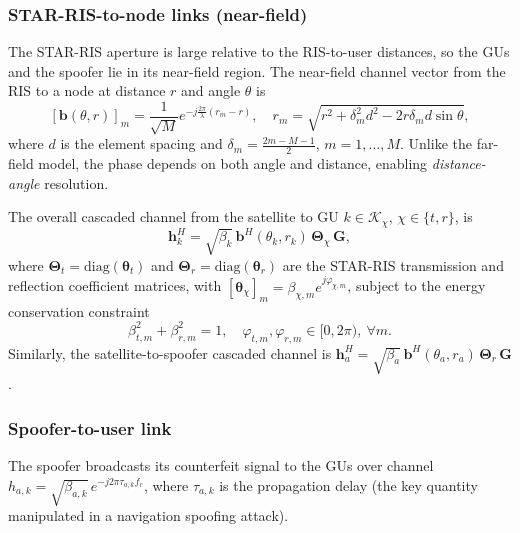 \subsubsection{STAR-RIS-to-node links (near-field)}
The STAR-RIS aperture is large relative to the RIS-to-user distances, so the GUs and the spoofer lie in its near-field region. The near-field channel vector from the RIS to a node at distance $r$ and angle $\theta$ is
\begin{equation}\label{eq:nfsteer}
    [\mathbf{b}(\theta, r)]_m = \frac{1}{\sqrt{M}} e^{-j\frac{2\pi}{\lambda}(r_m - r)}, \quad r_m = \sqrt{r^2 + \delta_m^2 d^2 - 2 r \delta_m d \sin\theta},
\end{equation}
where $d$ is the element spacing and $\delta_m = \frac{2m - M - 1}{2}$, $m = 1,\dots,M$. Unlike the far-field model, the phase depends on both angle and distance, enabling \emph{distance-angle} resolution.

The overall cascaded channel from the satellite to GU $k \in \mathcal{K}_\chi$, $\chi \in \{t, r\}$, is
\begin{equation}\label{eq:cascade}
    \mathbf{h}_k^H = \sqrt{\beta_k}\, \mathbf{b}^H(\theta_k, r_k)\, \boldsymbol{\Theta}_\chi\, \mathbf{G},
\end{equation}
where $\boldsymbol{\Theta}_t = \mathrm{diag}(\boldsymbol{\theta}_t)$ and $\boldsymbol{\Theta}_r = \mathrm{diag}(\boldsymbol{\theta}_r)$ are the STAR-RIS transmission and reflection coefficient matrices, with $[\boldsymbol{\theta}_\chi]_m = \beta_{\chi,m} e^{j\varphi_{\chi,m}}$, subject to the energy conservation constraint
\begin{equation}\label{eq:unity}
    \beta_{t,m}^2 + \beta_{r,m}^2 = 1, \quad \varphi_{t,m},\varphi_{r,m} \in [0, 2\pi), \ \forall m.
\end{equation}
Similarly, the satellite-to-spoofer cascaded channel is $\mathbf{h}_a^H = \sqrt{\beta_a}\, \mathbf{b}^H(\theta_a, r_a)\, \boldsymbol{\Theta}_r\, \mathbf{G}$.

\subsubsection{Spoofer-to-user link}
The spoofer broadcasts its counterfeit signal to the GUs over channel $h_{a,k} = \sqrt{\beta_{a,k}}\, e^{-j 2\pi \tau_{a,k} f_c}$, where $\tau_{a,k}$ is the propagation delay (the key quantity manipulated in a navigation spoofing attack).

